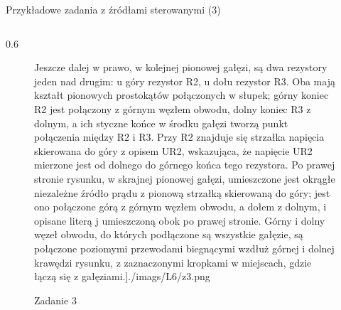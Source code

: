 \begin{frame}{Przykładowe zadania z źródłami sterowanymi (3)}
\begin{columns}
\begin{column}{0.6\textwidth}
\begin{figure}
{							Jeszcze dalej w prawo, w kolejnej pionowej gałęzi, są dwa rezystory jeden nad drugim: u góry rezystor R2, u dołu rezystor R3.
							Oba mają kształt pionowych prostokątów połączonych w słupek; górny koniec R2 jest połączony z górnym węzłem obwodu, dolny koniec R3 z dolnym, a ich styczne końce w środku gałęzi tworzą punkt połączenia między R2 i R3.
							Przy R2 znajduje się strzałka napięcia skierowana do góry z opisem UR2, wskazująca, że napięcie UR2 mierzone jest od dolnego do górnego końca tego rezystora.
							Po prawej stronie rysunku, w skrajnej pionowej gałęzi, umieszczone jest okrągłe niezależne źródło prądu z pionową strzałką skierowaną do góry; jest ono połączone górą z górnym węzłem obwodu, a dołem z dolnym, i opisane literą j umieszczoną obok po prawej stronie.
							Górny i dolny węzeł obwodu, do których podłączone są wszystkie gałęzie, są połączone poziomymi przewodami biegnącymi wzdłuż górnej i dolnej krawędzi rysunku, z zaznaczonymi kropkami w miejscach, gdzie łączą się z gałęziami.}]{./imags/L6/z3.png}
				\caption{Zadanie 3}
			\end{figure}
		\end{column}
	\end{columns}
\end{frame}

